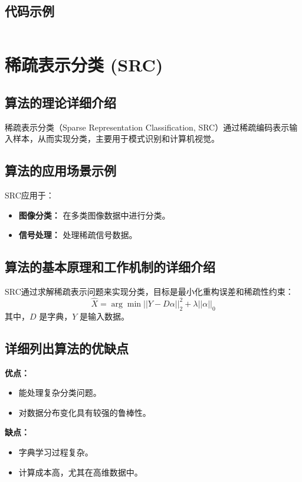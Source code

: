 \subsection*{代码示例}
\begin{lstlisting}

\end{lstlisting}


\section{稀疏表示分类 (SRC)}
\subsection*{算法的理论详细介绍}
稀疏表示分类（Sparse Representation Classification, SRC）通过稀疏编码表示输入样本，从而实现分类，主要用于模式识别和计算机视觉。

\subsection*{算法的应用场景示例}
SRC应用于：
\begin{itemize}
    \item \textbf{图像分类：} 在多类图像数据中进行分类。
    \item \textbf{信号处理：} 处理稀疏信号数据。
\end{itemize}

\subsection*{算法的基本原理和工作机制的详细介绍}
SRC通过求解稀疏表示问题来实现分类，目标是最小化重构误差和稀疏性约束：
\[
    \hat{X} = \arg\min || Y - D \alpha ||^2_2 + \lambda || \alpha ||_0
\]
其中，\(D\) 是字典，\(Y\) 是输入数据。

\subsection*{详细列出算法的优缺点}
\textbf{优点：}
\begin{itemize}
    \item 能处理复杂分类问题。
    \item 对数据分布变化具有较强的鲁棒性。
\end{itemize}

\textbf{缺点：}
\begin{itemize}
    \item 字典学习过程复杂。
    \item 计算成本高，尤其在高维数据中。
\end{itemize}


